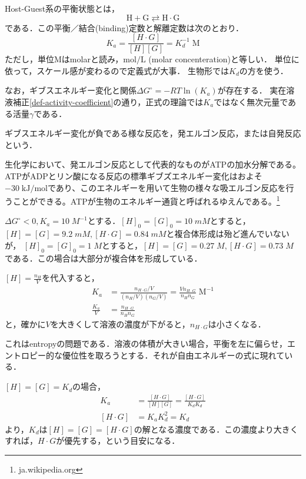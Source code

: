 \documentclass[uplatex, dvipdfmx]{jsreport}
\begin{document}
\begin{theory}
    Host-Guest系の平衡状態とは，
\[ \mathrm{H+G\rightleftarrows H\cdot G} \]
である．この平衡／結合(binding)定数と解離定数は次のとおり．
\[K_a=\frac{[H\cdot G]}{[H][G]}=K_d^{-1}\;\mathrm{M}\]
ただし，単位Mはmolarと読み，$\mathrm{mol/L}$ (molar concenteration)と等しい．
単位に依って，スケール感が変わるので定義式が大事．
生物形では$K_d$の方を使う．

なお，ギブスエネルギー変化と関係$\Delta G^\circ = -RT\ln(K_a)$が存在する．
実在溶液補正\ref{def-activity-coefficient}の通り，正式の理論では$K_a$ではなく無次元量である活量$\gamma$である．
\end{theory}
\begin{definition}
    ギブスエネルギー変化が負である様な反応を，発エルゴン反応，または自発反応という．
\end{definition}
\begin{example}[ATPの加水分解]
    生化学において、発エルゴン反応として代表的なものがATPの加水分解である。ATPがADPとリン酸になる反応の標準ギブズエネルギー変化はおよそ$-30\;\mathrm{kJ/mol}$であり、このエネルギーを用いて生物の様々な吸エルゴン反応を行うことができる。ATPが生物のエネルギー通貨と呼ばれるゆえんである。\footnote{ja.wikipedia.org}
\end{example}
\begin{example}[H-G系の初期濃度鋭敏性]
    $\Delta G^\circ<0, K_a=10\;M^{-1}$とする．$[H]_0=[G]_0=10\;mM$とすると，$[H]=[G]=9.2\;mM,[H\cdot G]=0.84\; mM$と複合体形成は殆ど進んでいないが，
    $[H]_0=[G]_0=1\;M$とすると，$[H]=[G]=0.27\;M,[H\cdot G]=0.73\; M$である．この場合は大部分が複合体を形成している．
\end{example}

\begin{explanation}[濃度が低いと複合体形成は進まない]
    $[H]=\frac{n_H}{V}$を代入すると，
\begin{align*}
    K_a &= \frac{n_{H\cdot G}/V}{(n_H/V)(n_G/V)} = \frac{Vn_{H\cdot G}}{n_Hn_G}\;\mathrm{M}^{-1} \\
    \frac{K_a}{V} &= \frac{n_{H\cdot G}}{n_Hn_G}
\end{align*}
と，確かに$V$を大きくして溶液の濃度が下がると，$n_{H\cdot G}$は小さくなる．
\end{explanation}
これはentropyの問題である．溶液の体積が大きい場合，平衡を左に偏らせ，エントロピー的な優位性を取ろうとする．それが自由エネルギーの式に現れている．

\begin{theory}
$[H]=[G]=K_d$の場合，
\begin{align*}
    K_a &= \frac{[H\cdot G]}{[H][G]} = \frac{[H\cdot G]}{K_dK_d} \\
    [H\cdot G] &= K_aK_d^2 = K_d
\end{align*}
より，$K_d$は$[H]=[G]=[H\cdot G]$の解となる濃度である．この濃度より大きくすれば，$H\cdot G$が優先する，という目安になる．
\end{theory}
\end{document}
